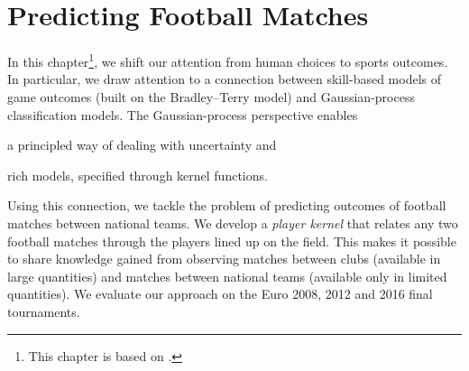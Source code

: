 \chapter{Predicting Football Matches}
\label{ch:playerkern}

In this chapter\footnote{%
This chapter is based on \citet*{maystre2016player}.},
we shift our attention from human choices to sports outcomes.
In particular, we draw attention to a connection between skill-based models of game outcomes (built on the Bradley--Terry model) and Gaussian-process classification models.
The Gaussian-process perspective enables
\begin{enuminline}
\item a principled way of dealing with uncertainty and
\item rich models, specified through kernel functions.
\end{enuminline}
Using this connection, we tackle the problem of predicting outcomes of football matches between national teams.
We develop a \emph{player kernel} that relates any two football matches through the players lined up on the field.
This makes it possible to share knowledge gained from observing matches between clubs (available in large quantities) and matches between national teams (available only in limited quantities).
We evaluate our approach on the Euro 2008, 2012 and 2016 final tournaments.







